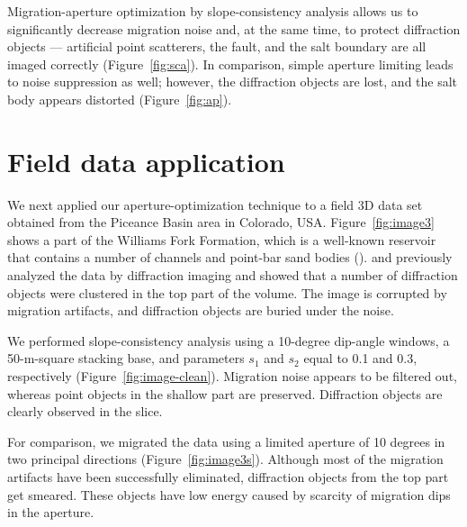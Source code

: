 Migration-aperture optimization by slope-consistency analysis allows us to significantly decrease migration noise and, at the same time, 
to protect diffraction objects --- artificial point scatterers, the fault, and the salt boundary are all imaged correctly (Figure~\ref{fig:sca}). 
In comparison, simple aperture limiting leads to noise suppression as well; however, the diffraction objects are lost, and the salt body appears
distorted (Figure~\ref{fig:ap}).


\section{Field data application}

We next applied our aperture-optimization technique to a field 3D data set obtained from the Piceance Basin area in Colorado, USA.
Figure~\ref{fig:image3} shows a part of the Williams Fork Formation, which is a well-known reservoir that
contains a number of channels and point-bar sand bodies (\citealp{pranter07}). \cite{will} and \cite{klokov12} previously analyzed
the data by diffraction imaging and showed that a number of diffraction objects were clustered in the top part of the volume.
The image is corrupted by migration artifacts, and diffraction objects are buried under the noise.

We performed slope-consistency analysis using a 10-degree dip-angle windows, a 50-m-square stacking base, and parameters $s_1$ and $s_2$ equal to
0.1 and 0.3, respectively (Figure~\ref{fig:image-clean}). 
Migration noise appears to be filtered out, whereas point objects in the shallow part are preserved. Diffraction objects are clearly observed
in the slice. 

For comparison, we migrated the data using a limited aperture of 10 degrees in two principal directions (Figure~\ref{fig:image3s}).
Although most of the migration artifacts have been successfully eliminated, diffraction objects from the top part get smeared. 
These objects have low energy caused by scarcity of migration dips in the aperture.


